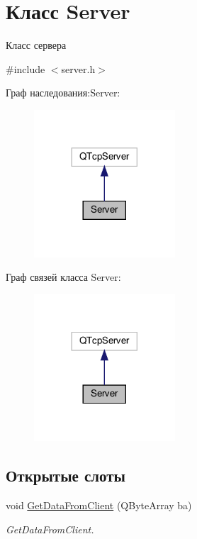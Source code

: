 \hypertarget{classServer}{}\section{Класс Server}
\label{classServer}


Класс сервера  




{\ttfamily \#include $<$server.\+h$>$}



Граф наследования\+:Server\+:\nopagebreak
\begin{figure}[H]
\begin{center}
\leavevmode
\includegraphics[width=149pt]{classServer__inherit__graph}
\end{center}
\end{figure}


Граф связей класса Server\+:\nopagebreak
\begin{figure}[H]
\begin{center}
\leavevmode
\includegraphics[width=149pt]{classServer__coll__graph}
\end{center}
\end{figure}
\subsection*{Открытые слоты}
\begin{DoxyCompactItemize}
\item 
void \hyperlink{classServer_a9ef1fd70a951bc612605f87b4540b308}{Get\+Data\+From\+Client} (Q\+Byte\+Array ba)
\begin{DoxyCompactList}\small\item\em Get\+Data\+From\+Client. \end{DoxyCompactList}\end{DoxyCompactItemize}
